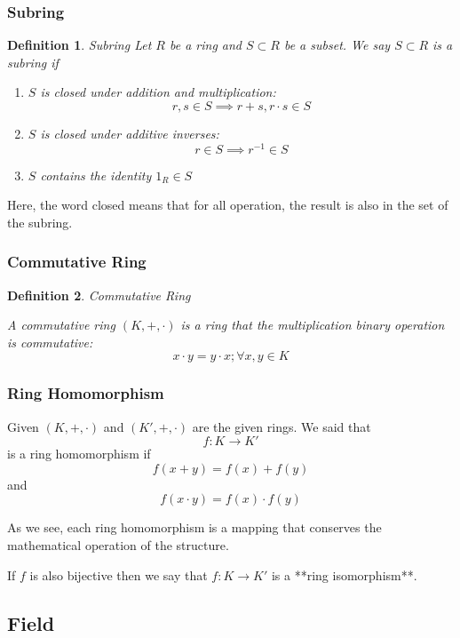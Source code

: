 \documentclass{book}
\newtheorem{Definition}{Definition}[section]
\numberwithin{identity}{subsection}
\numberwithin{Rule}{subsection}
\numberwithin{Theorem}{subsection}
\numberwithin{Definition}{subsection}
\begin{document}
\subsubsection{Subring} 

\begin{Definition}
    Subring 
Let $R$ be a ring and $S\subset R$ be a subset. We say $S\subset R$ is a subring if 
\begin{enumerate}
    \item $S$ is closed under addition and multiplication: $$r,s\in S\implies r+s, r\cdot s \in S$$
\item $S$ is closed under additive inverses: $$r\in S \implies r^{-1} \in S$$
\item $S$ contains the identity $1_{R}\in S$
\end{enumerate}
\end{Definition}

Here, the word closed means that for all operation, the result is also in the set of the subring. 

\subsubsection{Commutative Ring}

\begin{Definition}
    Commutative Ring
    
    A commutative ring $(K,+,\cdot)$ is a ring that the multiplication binary operation is commutative: $$x\cdot y = y \cdot x ;\forall x, y \in K$$
\end{Definition}

\subsubsection{Ring Homomorphism} 
Given $(K, +, \cdot)$ and $(K',+,\cdot)$ are the given rings. We said that $$f: K \longrightarrow K'$$ is a ring homomorphism if $$f(x+y)=f(x)+f(y)$$
and $$f(x\cdot y)= f(x)\cdot f(y)$$

As we see, each ring homomorphism is a mapping that conserves the mathematical operation of the structure. 

If $f$ is also bijective then we say that $f: K \longrightarrow K'$ is a **ring isomorphism**. 

\subsection{Field}
\end{document}
